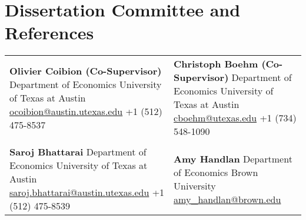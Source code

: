 \documentclass[a4paper, 10pt]{article}
\begin{document}
  \section{Dissertation Committee and References}
  \begin{tabular}{p{4.9cm} p{5.2cm}}
    \textbf{Olivier Coibion (Co-Supervisor)} \newline Department of Economics \newline University of Texas at Austin \newline \href{mailto:ocoibion@austin.utexas.edu}{ocoibion@austin.utexas.edu} \newline +1 (512) 475-8537 & \textbf{Christoph Boehm (Co-Supervisor)} \newline Department of Economics \newline University of Texas at Austin \newline \href{mailto:cboehm@utexas.edu}{cboehm@utexas.edu} \newline +1 (734) 548-1090\\
    &\\
    \textbf{Saroj Bhattarai} \newline Department of Economics \newline University of Texas at Austin \newline \href{mailto:saroj.bhattarai@austin.utexas.edu}{saroj.bhattarai@austin.utexas.edu} \newline +1 (512) 475-8539 & \textbf{Amy Handlan} \newline Department of Economics \newline Brown University \newline \href{mailto:amy\_handlan@brown.edu}{amy\_handlan@brown.edu}
  \end{tabular}

  \begin{publications}
  \end{publications}
\end{document}
